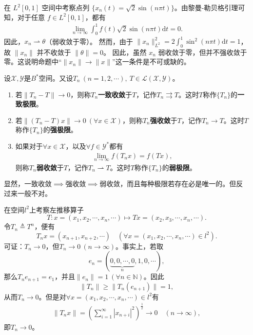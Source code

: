 \documentclass[../../main.tex]{subfiles}%
\begin{document}
\begin{example}
在 \(L^2[0,1]\) 空间中考察点列 \(\{x_n(t) = \sqrt{2}\sin(n\pi t)\}\)。由黎曼-勒贝格引理可知，对于任意 \(f \in L^2[0,1]\)，都有
\begin{align*}
\lim_{n\to\infty} \int_{0}^{1} f(t)\sqrt{2}\sin(n\pi t) \mathrm{d}t = 0.
\end{align*}
因此，\(x_n \rightharpoonup \theta\)（弱收敛于零）。
然而，由于 \(\|x_n\|_{L^2}^2 = 2\int_0^1 \sin^2(n\pi t) \mathrm{d}t = 1\)，故 \(\|x_n\|\) 并不收敛于 \(\|\theta\| = 0\)。
因此，虽然 \(x_n\) 弱收敛于零，但并不强收敛于零。这说明命题中“\(\|x_n\| \to \|x\|\)”这一条件是不可或缺的。
\end{example}


\begin{definition}
设$\mathscr{X},\mathscr{Y}$是$B^*$空间。又设$T_n\ (n=1,2,\cdots),\ T\in\mathscr{L}(\mathscr{X},\mathscr{Y})$。
\begin{enumerate}[(1)]
\item 若$\|T_n-T\|\to0$，则称$T_n$\textbf{一致收敛}于$T$，记作$T_n\rightrightarrows T$。这时$T$称作$\{T_n\}$的\textbf{一致极限}。

\item 若$\|(T_n-T)x\|\to0\ (\forall x\in\mathscr{X})$，则称$T_n$\textbf{强收敛}于$T$，记作$T_n\to T$。这时$T$称作$\{T_n\}$的\textbf{强极限}。

\item 如果对于$\forall x\in\mathscr{X}$，以及$\forall f\in\mathscr{Y}^*$都有
\begin{align*}
\lim\limits_{n\to\infty}f(T_nx)=f(Tx),
\end{align*}
则称$T_n$\textbf{弱收敛}于$T$，记作$T_n\rightharpoonup T$。这时$T$称作$\{T_n\}$的\textbf{弱极限}。
\end{enumerate}
\end{definition}
\begin{remark}
显然，一致收敛$\implies$强收敛$\implies$弱收敛，而且每种极限若存在必是唯一的。但反过来一般不对。
\end{remark}

\begin{example}[强收敛而不一致收敛]
 
在空间$l^2$上考察左推移算子
$$T:x=(x_1,x_2,\cdots,x_n,\cdots)\mapsto Tx=(x_2,x_3,\cdots,x_n,\cdots).$$
令$T_n\triangleq T^n$，便有
$$T_nx=(x_{n+1},x_{n+2},\cdots)\quad(\forall x=(x_1,x_2,\cdots,x_n,\cdots)\in l^2).$$
可证：$T_n\to0$，但$T_n\to 0\ (n\to\infty)$。事实上，若取
$$e_n=(\underbrace{0,0,\cdots,0}_{n},1,0,\cdots),$$
那么$T_ne_{n+1}=e_1$，并且$\|e_n\|=1\ (\forall n\in\mathbb{N})$。因此
$$\|T_n\|\geqslant\|T_n(e_{n+1})\|=1,$$
从而$T_n\to 0$。但是对$\forall x=(x_1,x_2,\cdots,x_n,\cdots)\in l^2$有
\begin{align*}
\|T_nx\|=\left(\sum\limits_{i=1}^{\infty}|x_{n+i}|^2\right)^{\frac{1}{2}}\to0\quad(n\to\infty),
\end{align*}
即$T_n\to0$。
\end{example}
\end{document}
